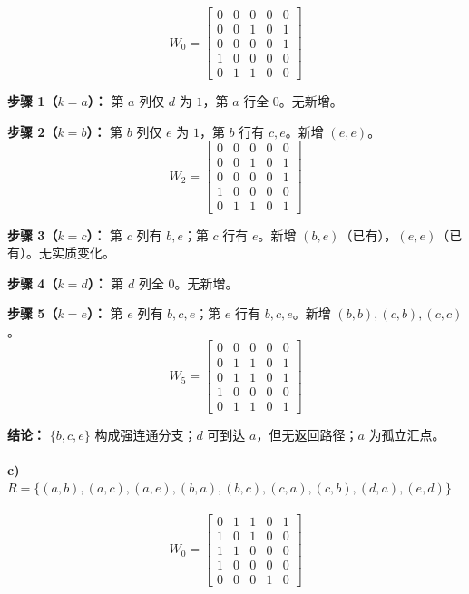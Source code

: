 \documentclass[11pt,UTF8]{article}
\begin{document}
\[
W_0 = \begin{bmatrix}
0 & 0 & 0 & 0 & 0 \\
0 & 0 & 1 & 0 & 1 \\
0 & 0 & 0 & 0 & 1 \\
1 & 0 & 0 & 0 & 0 \\
0 & 1 & 1 & 0 & 0
\end{bmatrix}
\]

\textbf{步骤 1（$k=a$）：} 第 $a$ 列仅 $d$ 为 $1$，第 $a$ 行全 $0$。无新增。

\textbf{步骤 2（$k=b$）：} 第 $b$ 列仅 $e$ 为 $1$，第 $b$ 行有 $c,e$。新增 $(e,e)$。
\[
W_2 = \begin{bmatrix}
0 & 0 & 0 & 0 & 0 \\
0 & 0 & 1 & 0 & 1 \\
0 & 0 & 0 & 0 & 1 \\
1 & 0 & 0 & 0 & 0 \\
0 & 1 & 1 & 0 & 1
\end{bmatrix}
\]

\textbf{步骤 3（$k=c$）：} 第 $c$ 列有 $b,e$；第 $c$ 行有 $e$。新增 $(b,e)$（已有），$(e,e)$（已有）。无实质变化。

\textbf{步骤 4（$k=d$）：} 第 $d$ 列全 $0$。无新增。

\textbf{步骤 5（$k=e$）：} 第 $e$ 列有 $b,c,e$；第 $e$ 行有 $b,c,e$。新增 $(b,b),(c,b),(c,c)$。
\[
W_5 = \begin{bmatrix}
0 & 0 & 0 & 0 & 0 \\
0 & 1 & 1 & 0 & 1 \\
0 & 1 & 1 & 0 & 1 \\
1 & 0 & 0 & 0 & 0 \\
0 & 1 & 1 & 0 & 1
\end{bmatrix}
\]

\textbf{结论：} $\{b,c,e\}$ 构成强连通分支；$d$ 可到达 $a$，但无返回路径；$a$ 为孤立汇点。

\paragraph{c) $R = \{(a,b),(a,c),(a,e),(b,a),(b,c),(c,a),(c,b),(d,a),(e,d)\}$}

\[
W_0 = \begin{bmatrix}
0 & 1 & 1 & 0 & 1 \\
1 & 0 & 1 & 0 & 0 \\
1 & 1 & 0 & 0 & 0 \\
1 & 0 & 0 & 0 & 0 \\
0 & 0 & 0 & 1 & 0
\end{bmatrix}
\]
\end{document}
